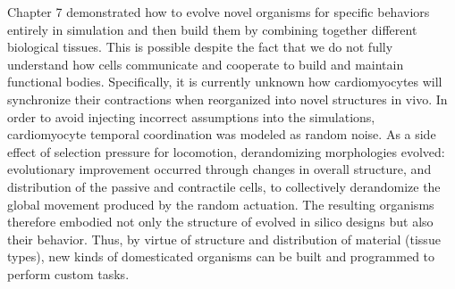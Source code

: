 Chapter 7 demonstrated how to evolve novel organisms for specific behaviors entirely in simulation and then build them 
by combining together different biological tissues.
This is possible despite the fact that we do not fully understand how cells communicate and cooperate to build and maintain functional bodies.
Specifically,
it is currently unknown how cardiomyocytes will synchronize their contractions when reorganized into novel structures in vivo.
In order to avoid injecting incorrect assumptions into the simulations,
cardiomyocyte temporal coordination was modeled as random noise.
As a side effect of selection pressure for locomotion, derandomizing morphologies evolved: evolutionary improvement occurred through changes in overall structure, and distribution of the passive and contractile cells, to collectively derandomize the global movement produced by the random actuation. 
The resulting organisms therefore embodied not only the structure of evolved in silico designs but also their behavior.
Thus, by virtue of structure and distribution of material (tissue types), new kinds of domesticated organisms can be built and programmed to perform custom tasks.










